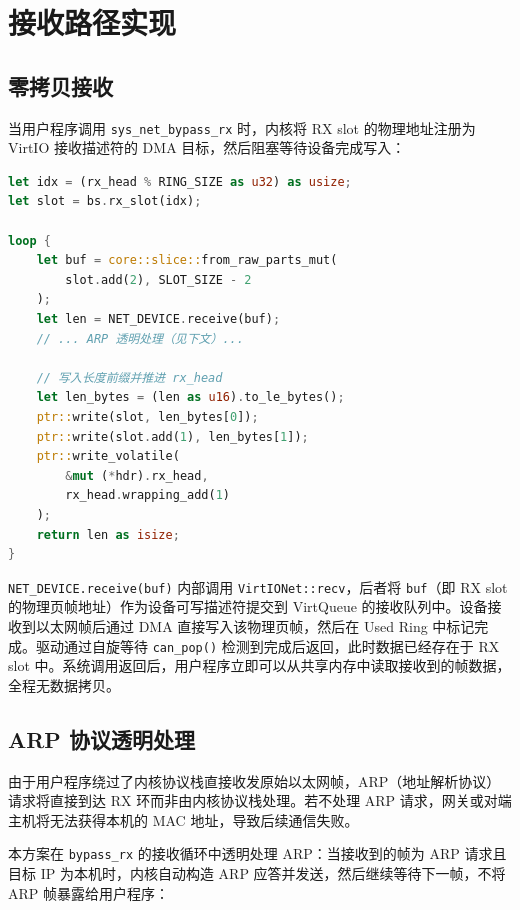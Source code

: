 \section{接收路径实现}

\subsection{零拷贝接收}

当用户程序调用 \texttt{sys\_net\_bypass\_rx} 时，内核将 RX slot 的物理地址注册为 VirtIO 接收描述符的 DMA 目标，然后阻塞等待设备完成写入：

\begin{lstlisting}[language=Rust, caption={内核 RX：将 slot 注册为 DMA 目标并阻塞等待}]
let idx = (rx_head % RING_SIZE as u32) as usize;
let slot = bs.rx_slot(idx);

loop {
    let buf = core::slice::from_raw_parts_mut(
        slot.add(2), SLOT_SIZE - 2
    );
    let len = NET_DEVICE.receive(buf);
    // ... ARP 透明处理（见下文）...

    // 写入长度前缀并推进 rx_head
    let len_bytes = (len as u16).to_le_bytes();
    ptr::write(slot, len_bytes[0]);
    ptr::write(slot.add(1), len_bytes[1]);
    ptr::write_volatile(
        &mut (*hdr).rx_head,
        rx_head.wrapping_add(1)
    );
    return len as isize;
}
\end{lstlisting}

\texttt{NET\_DEVICE.receive(buf)} 内部调用 \texttt{VirtIONet::recv}，后者将 \texttt{buf}（即 RX slot 的物理页帧地址）作为设备可写描述符提交到 VirtQueue 的接收队列中。设备接收到以太网帧后通过 DMA 直接写入该物理页帧，然后在 Used Ring 中标记完成。驱动通过自旋等待 \texttt{can\_pop()} 检测到完成后返回，此时数据已经存在于 RX slot 中。系统调用返回后，用户程序立即可以从共享内存中读取接收到的帧数据，全程无数据拷贝。

\subsection{ARP 协议透明处理}

由于用户程序绕过了内核协议栈直接收发原始以太网帧，ARP（地址解析协议）请求将直接到达 RX 环而非由内核协议栈处理。若不处理 ARP 请求，网关或对端主机将无法获得本机的 MAC 地址，导致后续通信失败。

本方案在 \texttt{bypass\_rx} 的接收循环中透明处理 ARP：当接收到的帧为 ARP 请求且目标 IP 为本机时，内核自动构造 ARP 应答并发送，然后继续等待下一帧，不将 ARP 帧暴露给用户程序：

